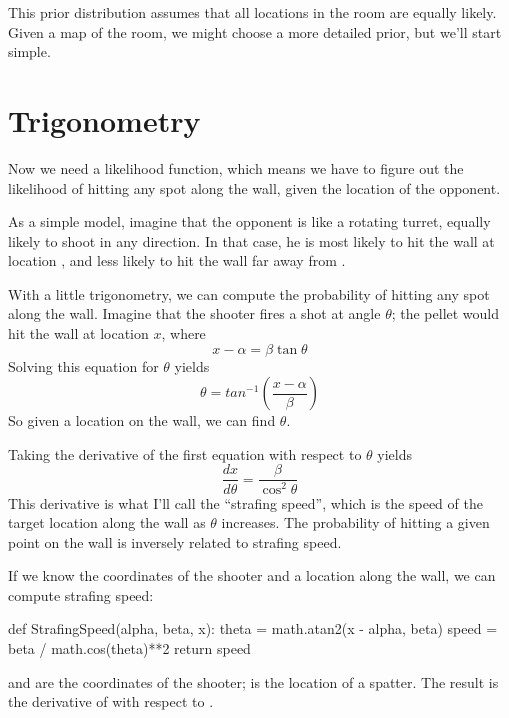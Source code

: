 \documentclass[12pt]{book}
\theoremstyle{exercise}
\begin{document}
This prior distribution assumes that all locations in the room are
equally likely.  Given a map of the room, we might choose a more
detailed prior, but we'll start simple.


\section{Trigonometry}

Now we need a likelihood function, which means we have to figure
out the likelihood of hitting any spot along the wall, given
the location of the opponent.

As a simple model, imagine that the opponent is like a rotating
turret, equally likely to shoot in any direction.
In that case, he is most likely to hit
the wall at location , and less likely to hit the wall far
away from .

With a little trigonometry, we can compute the probability of hitting
any spot along the wall.  Imagine that the shooter fires a shot at
angle $\theta$; the pellet would hit the wall at location $x$, where
%
\[ x - \alpha = \beta \tan \theta \]
%
Solving this equation for $\theta$ yields
%
\[ \theta = tan^{-1} \left( \frac{x - \alpha}{\beta} \right) \]
%
So given a location on the wall, we can find $\theta$.

Taking the derivative of the first equation with respect to
$\theta$ yields
%
\[ \frac{dx}{d\theta} = \frac{\beta}{\cos^2 \theta} \]
%
This derivative is what I'll call the ``strafing speed'',
which is the speed of the target location along the wall as $\theta$
increases.  The probability of hitting a given point on the wall is
inversely related to strafing speed.

If we know the coordinates of the shooter and a location 
along the wall, we can compute strafing speed:

\begin{code}
def StrafingSpeed(alpha, beta, x):
    theta = math.atan2(x - alpha, beta)
    speed = beta / math.cos(theta)**2
    return speed
\end{code}

 and  are the coordinates of the shooter;
 is the location of a spatter.  The result is
the derivative of  with respect to .
\end{document}
